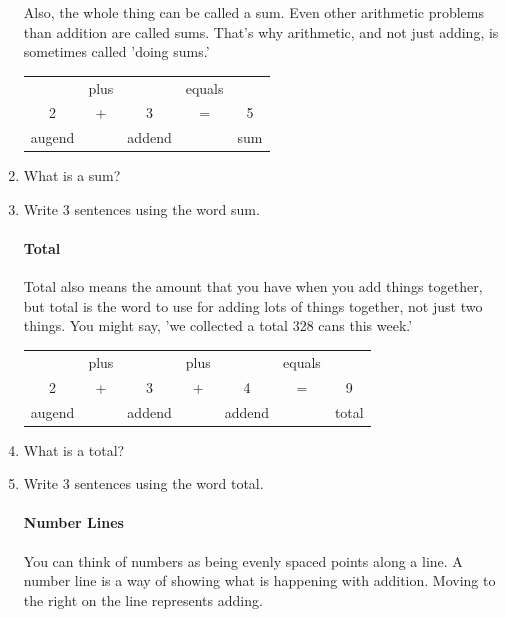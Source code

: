 \documentclass[12pt]{article}
\begin{document}
\begin{enumerate}
Also, the whole thing can be called a sum. Even other arithmetic problems than addition are called sums. That's why arithmetic, and not just adding, is sometimes called 'doing sums.'

\begin{table}[H]
    \centering
    \begin{tabular}{ccccc}
     \   & plus &   \    & equals &  \ \\
     \large{2}   &  \large{+}   &   \large{3}    &   \large{=}    &  \large{5} \\
  augend &  \   & addend &   \    & sum
    \end{tabular}
\end{table}

\item What is a sum?
\item Write 3 sentences using the word sum.

\paragraph{Total} Total also means the amount that you have when you add things together, but total is the word to use for adding lots of things together, not just two things. You might say, 'we collected a total 328 cans this week.'

\begin{table}[H]
    \centering
    \begin{tabular}{ccccccc}
     \   & plus &   \    & plus &   \    & equals & \  \\
     \large{2}   &  \large{+}   &   \large{3}    &   \large{+}  &   \large{4}    &   \large{=}    &  \large{9} \\
  augend &  \   & addend &   \  & addend &   \    & total
    \end{tabular}
\end{table}

\item What is a total?
\item Write 3 sentences using the word total.

\paragraph{Number Lines}
You can think of numbers as being evenly spaced points along a line. A number line is a way of showing what is happening with addition. Moving to the right on the line represents adding.\\


\end{enumerate}
\end{document}
